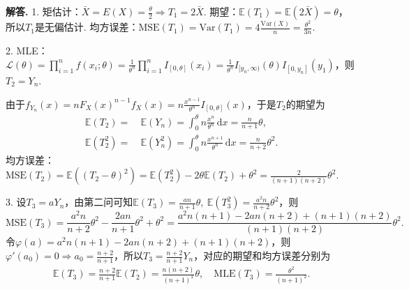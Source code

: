 \documentclass[12pt, a4paper, oneside]{ctexart}
\newenvironment{solution}[1][]{\par\noindent\textbf{#1解答. }}{\smallskip\par}  %
\def\E{\mathbb{E}}          %
\def\var{\text{Var}}        %
\def\d{\mathrm{d}}          %
\def\L{\mathcal{L}}         %
\def\add{\vspace{1ex}}      %
\begin{document}
\begin{solution}
    1. 矩估计：$\bar{X} = E(X) = \frac{\theta}{2}\Rightarrow T_1 = 2\bar{X}$. 期望：$\E(T_1) = \E(2\bar{X}) = \theta$，所以$T_1$是无偏估计.  均方误差：$\text{MSE}(T_1) = \var(T_1) = 4\frac{\var(X)}{n} = \frac{\theta^2}{3n}$.\add

    2. MLE：$\L(\theta) = \prod_{i=1}^nf(x_i;\theta) = \frac{1}{\theta^n}\prod_{i=1}^nI_{[0,\theta]}(x_i) = \frac{1}{\theta^n}I_{[y_n,\infty)}(\theta)I_{[0,y_n]}(y_1)$，则$T_2 = Y_n$.
    
    由于$f_{Y_n}(x) = nF_X(x)^{n-1}f_X(x)  = n\frac{x^{n-1}}{\theta^n}I_{[0,\theta]}(x)$，于是$T_2$的期望为
    \begin{align*}
        \E(T_2) =&\ \E(Y_n) = \int_0^\theta n\frac{x^n}{\theta^n}\,\d x = \frac{n}{n+1}\theta,\\
        \E(T_2^2) =&\ \E(Y_n^2) = \int_0^\theta n\frac{x^{n+1}}{\theta^n}\,\d x = \frac{n}{n+2}\theta^2.
    \end{align*}
    均方误差：$\text{MSE}(T_2) = \E((T_2-\theta)^2) = \E(T_2^2)-2\theta\E(T_2)+\theta^2 = \frac{2}{(n+1)(n+2)}\theta^2$.\add

    3. 设$T_3 = aY_n$，由第二问可知$\E(T_3) = \frac{an}{n+1}\theta,\ \E(T_3^2) = \frac{a^2n}{n+2}\theta^2$，则
    \begin{equation*}
        \text{MSE}(T_3) = \frac{a^2n}{n+2}\theta^2-\frac{2an}{n+1}\theta^2+\theta^2 = \frac{a^2n(n+1)-2an(n+2)+(n+1)(n+2)}{(n+1)(n+2)}\theta^2.
    \end{equation*}
    令$\varphi(a) =a^2n(n+1)-2an(n+2)+(n+1)(n+2)$，则$\varphi'(a_0) = 0\Rightarrow a_0 = \frac{n+2}{n+1}$，所以$T_3 = \frac{n+2}{n+1}Y_n$，对应的期望和均方误差分别为
    \begin{align*}
        \E(T_3) = \frac{n+2}{n+1}\E(T_2) = \frac{n(n+2)}{(n+1)^2}\theta,\quad
        \text{MLE}(T_3) = \frac{\theta^2}{(n+1)^2}.
    \end{align*}


\end{solution}
\end{document}

